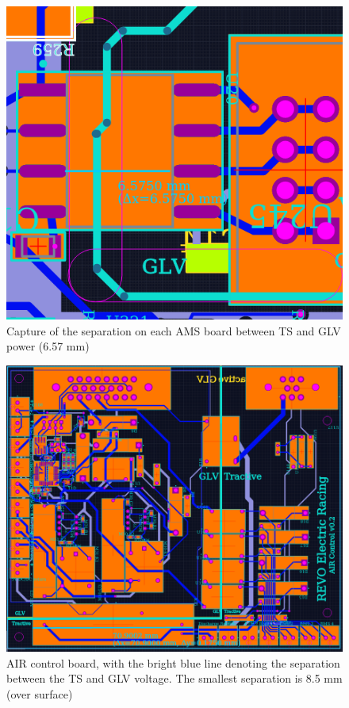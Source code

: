 \documentclass{article}
\begin{document}
\begin{figure}[H]
    \centering
    \includegraphics[width = 0.6 \textwidth]{bms_separation}
    \caption{Capture of the separation on each AMS board between TS and GLV power (6.57 mm)}
    \label{amsseparation}
\end{figure}

\begin{figure}[H]
    \centering
    \includegraphics[width = 0.6 \textwidth]{aircntrlCAD}
    \caption{AIR control board, with the bright blue line denoting the separation between the TS and GLV voltage. The smallest separation is 8.5 mm (over surface)}
    \label{AIRcontrolspacing}
\end{figure}
\end{document}
